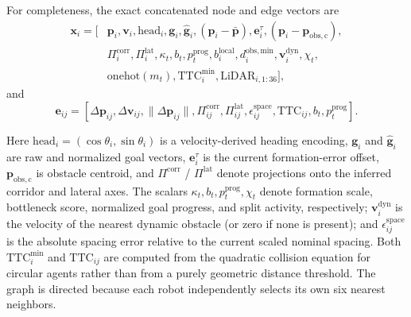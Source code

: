 \documentclass[journal]{IEEEtran}
\newcommand{\bfp}{\mathbf{p}}
\newcommand{\bfv}{\mathbf{v}}
\newcommand{\bfe}{\mathbf{e}}
\begin{document}
For completeness, the exact concatenated node and edge vectors are
\begin{equation}
\begin{aligned}
\mathbf{x}_i = [&\bfp_i,\bfv_i,\mathrm{head}_i,\mathbf{g}_i,\hat{\mathbf{g}}_i,
(\bfp_i-\bar{\bfp}),\bfe_i^\tau,(\bfp_i-\bfp_{\mathrm{obs,c}}), \\
&\Pi_i^{\mathrm{corr}},\Pi_i^{\mathrm{lat}},
\kappa_t,b_t,p_t^{\mathrm{prog}},b_i^{\mathrm{local}},d_i^{\mathrm{obs,min}},
\bfv_i^{\mathrm{dyn}},\chi_t, \\
&\mathrm{onehot}(m_t),\mathrm{TTC}_i^{\min},
\mathrm{LiDAR}_{i,1:36}],
\end{aligned}
\label{eq:node_features}
\end{equation}
and
\begin{equation}
\mathbf{e}_{ij} =
[\Delta \bfp_{ij},\Delta \bfv_{ij},\|\Delta \bfp_{ij}\|,
\Pi_{ij}^{\mathrm{corr}},\Pi_{ij}^{\mathrm{lat}},
\epsilon_{ij}^{\mathrm{space}},\mathrm{TTC}_{ij},b_t,p_t^{\mathrm{prog}}].
\label{eq:edge_features}
\end{equation}

Here $\mathrm{head}_i=(\cos\theta_i,\sin\theta_i)$ is a velocity-derived
heading encoding, $\mathbf{g}_i$ and $\hat{\mathbf{g}}_i$ are raw and
normalized goal vectors, $\bfe_i^\tau$ is the current formation-error
offset, $\bfp_{\mathrm{obs,c}}$ is obstacle centroid, and
$\Pi^{\mathrm{corr}}$ / $\Pi^{\mathrm{lat}}$ denote projections onto
the inferred corridor and lateral axes. The scalars
$\kappa_t,b_t,p_t^{\mathrm{prog}},\chi_t$ denote formation scale,
bottleneck score, normalized goal progress, and split activity,
respectively; $\bfv_i^{\mathrm{dyn}}$ is the velocity of the nearest
dynamic obstacle (or zero if none is present); and
$\epsilon_{ij}^{\mathrm{space}}$ is the absolute spacing error relative
to the current scaled nominal spacing. Both $\mathrm{TTC}_i^{\min}$ and
$\mathrm{TTC}_{ij}$ are computed from the quadratic collision equation
for circular agents rather than from a purely geometric distance
threshold. The graph is directed because each robot independently
selects its own six nearest neighbors.
\end{document}
